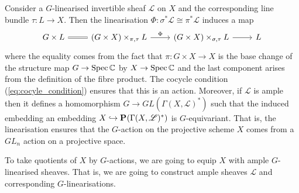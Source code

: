 \documentclass[12pt]{ociamthesis}  %
\begin{document}
\begin{example}
  Consider a $G$-linearised invertible sheaf $\mathscr L$ on $X$
  and the corresponding line bundle $\tau : L\to X$. Then the linearisation
  $\Phi : \sigma^*\mathscr L \cong \pi^*\mathscr L$ induces
  a map
  \begin{equation*}
    \begin{tikzcd}
      {G\times L} & {(G\times X)\times_{\pi,\tau} L} & {(G\times X)\times_{\sigma,\tau} L} & L
      \arrow[Rightarrow, no head, from=1-1, to=1-2]
      \arrow["\Phi", from=1-2, to=1-3]
      \arrow[from=1-3, to=1-4]
    \end{tikzcd}
  \end{equation*}
  where the equality comes from the fact that $\pi : G\times X \to X$
  is the base change of the structure map $G\to\operatorname{Spec}\mathbb C$
  by $X\to\operatorname{Spec}\mathbb C$ and the last component arises from the
  definition of the fibre product. The cocycle condition
  (\ref{eq:cocyle_condition}) ensures that this is an action. \cite[84]{huybrechts2010}
  Moreover, if $\mathscr L$ is ample then it defines a homomorphism
  $G\to GL(\Gamma(X,\mathscr L)^*)$ such that the induced embedding
  an embedding $X\hookrightarrow\mathbf{P}^{}_{}(\Gamma(X,\mathscr L)^*)$ is
  $G$-equivariant. \cite[Remark 5.20]{hoskins2016} That is, the
  linearisation ensures that the $G$-action on the projective
  scheme $X$ comes from a $GL_n$ action on a projective space.
 \end{example}

To take quotients of $X$ by $G$-actions, we are going to equip
$X$ with ample $G$-linearised sheaves. That is, we are
going to construct ample sheaves $\mathscr L$ and corresponding
$G$-linearisations.
\end{document}
